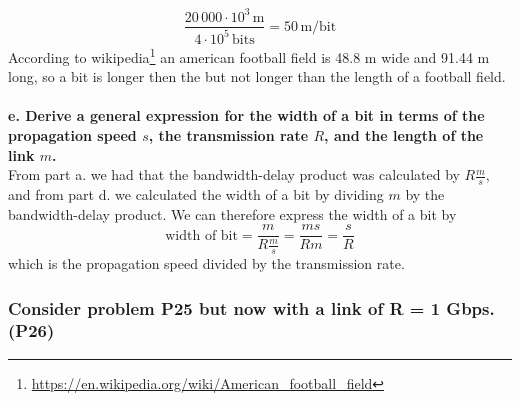 \begin{equation*}
    \frac{20 \, 000 \cdot 10^3 \, \text{m}}{4 \cdot 10^5  \, \text{bits}} = 50 \, \text{m/bit}
\end{equation*}
According to wikipedia\footnote{\url{https://en.wikipedia.org/wiki/American_football_field}} an american football field is 48.8 m wide and 91.44 m long, so a bit is longer then the but not longer than the length of a football field. \\
\\
\textbf{e. Derive a general expression for the width of a bit in terms of the propagation speed $s$, the transmission rate $R$, and the length of the link $m$.} \\
From part a. we had that the bandwidth-delay product was calculated by $R \frac{m}{s}$, and from part d. we calculated the width of a bit by dividing $m$ by the bandwidth-delay product. We can therefore express the width of a bit by
\begin{equation*}
    \text{width of bit} = \frac{m}{R \frac{m}{s}} = \frac{ms}{Rm} = \frac{s}{R}
\end{equation*}
which is the propagation speed divided by the transmission rate. 



\subsubsection{Consider problem P25 but now with a link of R = 1 Gbps. (P26)}

